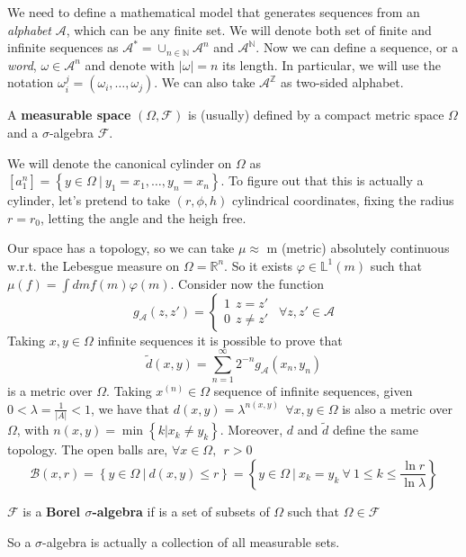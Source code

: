 We need to define a mathematical model that generates sequences from an \emph{alphabet} $\mathcal{A}$, which can be any finite set.
We will denote both set of finite and infinite sequences as $\mathcal{A}^{*} = \cup_{n \in \mathbb{N}} \mathcal{A}^n$ and $\mathcal{A}^\mathbb{N}$.
Now we can define a sequence, or a \emph{word}, $\omega \in \mathcal{A}^n$ and denote with $\left\lvert \omega \right\rvert = n$ its length.
In particular, we will use the notation $\omega_i^j = \left(\omega_i, \ldots, \omega_j\right)$.
We can also take $\mathcal{A}^\mathbb{Z}$ as two-sided alphabet.

\begin{definition}
    A \textbf{measurable space} $\left(\Omega, \mathcal{F}\right)$ is (usually) defined by a compact metric space $\Omega$ and a $\sigma$-algebra $\mathcal{F}$.
\end{definition}

We will denote the canonical cylinder on $\Omega$ as $\left[a_1^n\right] = \left\{y \in \Omega \ \vert \ y_1 = x_1, \ldots, y_n = x_n\right\}$.
To figure out that this is actually a cylinder, let's pretend to take $\left(r, \phi, h\right)$ cylindrical coordinates, fixing the radius $r = r_0$, letting the angle and the heigh free.

Our space has a topology, so we can take $\mu \approx$ m (metric) absolutely continuous w.r.t. the Lebesgue measure on $\Omega = \mathbb{R}^n$.
So it exists $\varphi \in \mathbb{L}^1(m)$ such that $\mu(f) = \int dm f(m)\varphi(m)$.
Consider now the function
\begin{equation*}
    g_\mathcal{A}\left(z, z'\right) =
    \begin{cases}
        1 \ \ z = z' \\
        0 \ \ z \neq z'
    \end{cases}
    \ \ \forall z, z' \in \mathcal{A}
\end{equation*}
Taking $x, y \in \Omega$ infinite sequences it is possible to prove that
\begin{equation*}
    \widetilde{d}\left(x, y\right) = \sum_{n=1}^\infty 2^{-n} g_\mathcal{A}\left(x_n, y_n\right)
\end{equation*}
is a metric over $\Omega$.
Taking $x^{(n)} \in \Omega$ sequence of infinite sequences, given $0 < \lambda = \frac{1}{\left\lvert A\right\rvert} < 1$, we have that $d(x, y) = \lambda^{n\left(x, y\right)} \ \ \forall x, y \in \Omega$ is also a metric over $\Omega$, with $n(x, y) = \min\left\{k \vert x_k \neq y_k\right\}$.
Moreover, $d$ and $\widetilde{d}$ define the same topology.
The open balls are, $\forall x \in \Omega, \ \ r > 0$
\begin{equation*}
    \mathcal{B}\left(x, r\right) =  \left\{y \in \Omega \ \vert \ d(x, y) \leq r\right\} = \left\{y \in \Omega \ \vert \ x_k = y_k \ \forall \ 1 \leq k \leq \frac{\ln r}{\ln \lambda}\right\}
\end{equation*}
\begin{definition}
    $\mathcal{F}$ is a \textbf{Borel $\sigma$-algebra} if is a set of subsets of $\Omega$ such that $\Omega \in \mathcal{F}$
\end{definition}
So a $\sigma$-algebra is actually a collection of all measurable sets.